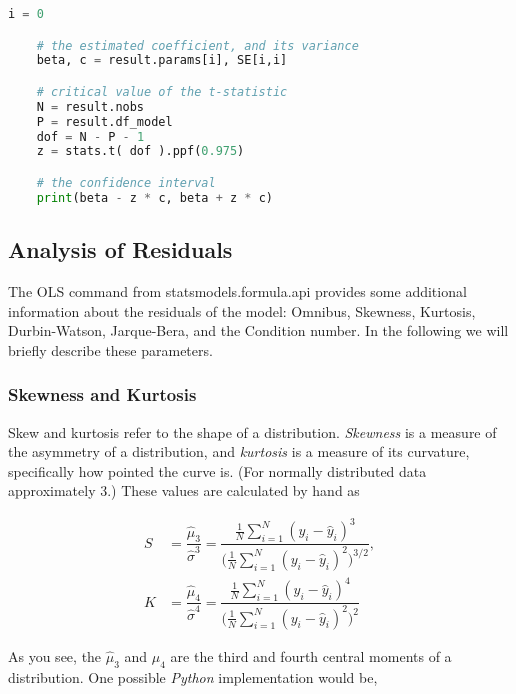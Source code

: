 \begin{lstlisting}[language=Python]
    i = 0

    # the estimated coefficient, and its variance
    beta, c = result.params[i], SE[i,i]

    # critical value of the t-statistic
    N = result.nobs
    P = result.df_model
    dof = N - P - 1
    z = stats.t( dof ).ppf(0.975)

    # the confidence interval
    print(beta - z * c, beta + z * c)
\end{lstlisting}

\subsection{Analysis of Residuals}

The \textsf{OLS} command from \textsf{statsmodels.formula.api} provides some additional information about the residuals of the model: Omnibus, Skewness, Kurtosis, Durbin-Watson, Jarque-Bera, and the Condition number. In the following we will briefly describe these parameters.

\subsubsection{Skewness and Kurtosis}

Skew and kurtosis refer to the shape of a distribution. \emph{Skewness} is a measure of the asymmetry of a distribution, and \emph{kurtosis} is a measure of its curvature, specifically how pointed the curve is. (For normally distributed data approximately 3.) These values are calculated by hand as

\begin{subequations}
\begin{align}
    S &= \dfrac{\hat{\mu}_{3}}{\hat{\sigma}^{3}} = \dfrac{ \frac{1}{N} \displaystyle \sum_{i=1}^{N} ( y_{i} - \hat{y}_{i} )^{3} }{ \biggl( \frac{1}{N} \displaystyle \sum_{i=1}^{N} ( y_{i} - \hat{y}_{i} )^{2} \biggr)^{3/2}}, \\
    K &= \dfrac{\hat{\mu}_{4}}{\hat{\sigma}^{4}} = \dfrac{ \frac{1}{N} \displaystyle \sum_{i=1}^{N} ( y_{i} - \hat{y}_{i} )^{4} }{ \biggl( \frac{1}{N} \displaystyle \sum_{i=1}^{N} ( y_{i} - \hat{y}_{i} )^{2} \biggr)^{2}}
\end{align}
\end{subequations}


As you see, the $\hat{\mu}_3$ and $\hat{\mu}_4$ are the third and fourth central moments of a distribution. One possible \emph{Python} implementation would be,

